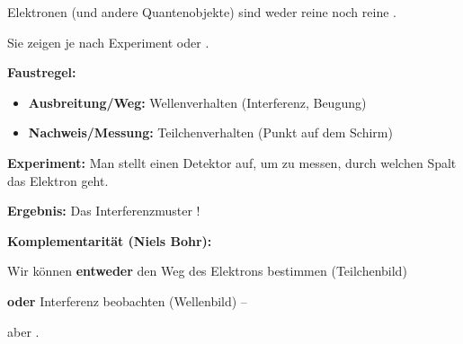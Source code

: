 \documentclass[11pt,a4paper]{article}
\begin{document}
\begin{tcolorbox}[merkbox={Kasten 2: Welle-Teilchen-Dualismus}]
Elektronen (und andere Quantenobjekte) sind weder reine \underline{\hspace{2cm}} noch reine \underline{\hspace{2cm}}.

\vspace{0.3em}
Sie zeigen je nach Experiment \underline{\hspace{4cm}} oder \underline{\hspace{4cm}}.

\vspace{0.3em}
\textbf{Faustregel:}
\begin{itemize}[nosep, leftmargin=*]
    \item \textbf{Ausbreitung/Weg:} Wellenverhalten (Interferenz, Beugung)
    \item \textbf{Nachweis/Messung:} Teilchenverhalten (Punkt auf dem Schirm)
\end{itemize}
\end{tcolorbox}

\vspace{0.5em}


\begin{tcolorbox}[merkbox={Kasten 3: Komplementaritätsprinzip}]
\textbf{Experiment:} Man stellt einen Detektor auf, um zu messen, durch welchen Spalt das Elektron geht.

\vspace{0.3em}
\textbf{Ergebnis:} Das Interferenzmuster \underline{\hspace{3cm}}!

\vspace{0.5em}
\textbf{Komplementarität (Niels Bohr):}

Wir können \textbf{entweder} den Weg des Elektrons bestimmen (Teilchenbild)

\textbf{oder} Interferenz beobachten (Wellenbild) –

aber \underline{\hspace{4cm}}.
\end{tcolorbox}

\vspace{0.5em}


\vspace{0.5em}

\end{document}
